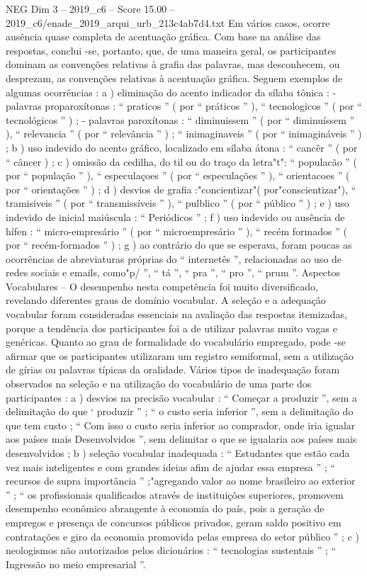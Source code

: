 \begin{textsample}{NEG Dim 3 – 2019\_c6 – Score 15.00 – 2019\_c6/enade\_2019\_arqui\_urb\_213c4ab7d4.txt}
Em vários casos, ocorre ausência quase completa de acentuação gráfica.
Com base na análise das respostas, conclui -se, portanto, que, de uma maneira geral, os participantes dominam as convenções relativas à grafia das palavras, mas desconhecem, ou desprezam, as convenções relativas à acentuação gráfica.
Seguem exemplos de algumas ocorrências : a ) eliminação do acento indicador da sílaba tônica : - palavras proparoxítonas : “ praticos ” ( por “ práticos ” ), “ tecnologicos ” ( por “ tecnológicos ” ) ; - palavras paroxítonas : “ diminuissem ” ( por “ diminuíssem ” ), “ relevancia ” ( por “ relevância ” ) ; “ inimaginaveis ” ( por “ inimagináveis ” ) ; b ) uso indevido do acento gráfico, localizado em sílaba átona : “ cancêr ” ( por “ câncer ) ; c ) omissão da cedilha, do til ou do traço da letra"t": “ populacão ” ( por “ população ” ), “ especulaçoes ” ( por “ especulações ” ), “ orientacoes ” ( por “ orientações ” ) ; d ) desvios de grafia :"concientizar"( por"conscientizar"), “ tramisiveis ” ( por “ transmissíveis ” ), “ pulblico ” ( por “ público ” ) ; e ) uso indevido de inicial maiúscula : “ Periódicos ” ; f ) uso indevido ou ausência de hífen : “ micro-empresário ” ( por “ microempresário ” ), “ recém formados ” ( por “ recém-formados ” ) ; g ) ao contrário do que se esperava, foram poucas as ocorrências de abreviaturas próprias do “ internetês ”, relacionadas ao uso de redes sociais e emails, como"p/ ”, “ tá ”, “ pra ”, “ pro ”, “ prum ”.
Aspectos Vocabulares – O desempenho nesta competência foi muito diversificado, revelando diferentes graus de domínio vocabular.
A seleção e a adequação vocabular foram consideradas essenciais na avaliação das respostas itemizadas, porque a tendência dos participantes foi a de utilizar palavras muito vagas e genéricas.
Quanto ao grau de formalidade do vocabulário empregado, pode -se afirmar que os participantes utilizaram um registro semiformal, sem a utilização de gírias ou palavras típicas da oralidade.
Vários tipos de inadequação foram observados na seleção e na utilização do vocabulário de uma parte dos participantes : a ) desvios na precisão vocabular : “ Começar a produzir ”, sem a delimitação do que ‘ produzir ” ; “ o custo seria inferior ”, sem a delimitação do que tem custo ; “ Com isso o custo seria inferior ao comprador, onde iria igualar aos países mais Desenvolvidos ”, sem delimitar o que se igualaria aos países mais desenvolvidos ; b ) seleção vocabular inadequada : “ Estudantes que estão cada vez mais inteligentes e com grandes ideias afim de ajudar essa empresa ” ; “ recursos de supra importância ” ;"agregando valor ao nome brasileiro ao exterior ” ; “ os profissionais qualificados através de instituições superiores, promovem desempenho econômico abrangente à economia do país, pois a geração de empregos e presença de concursos públicos privados, geram saldo positivo em contratações e giro da economia promovida pelas empresa do setor público ” ; c ) neologismos não autorizados pelos dicionários : “ tecnologias sustentais ” ; “ Ingressão no meio empresarial ”.

\end{textsample}
